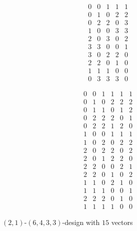 \documentclass[a4paper, 11pt]{article}
\theoremstyle{definition}
\begin{document}
\begin{figure}[htbp]
  \centering

  \begin{minipage}{0.48\linewidth}
    \centering
    \[
    \begin{array}{ccccc}
    0 & 0 & 1 & 1 & 1 \\
    0 & 1 & 0 & 2 & 2 \\
    0 & 2 & 2 & 0 & 3 \\
    1 & 0 & 0 & 3 & 3 \\
    2 & 0 & 3 & 0 & 2 \\
    3 & 3 & 0 & 0 & 1 \\
    3 & 0 & 2 & 2 & 0 \\
    2 & 2 & 0 & 1 & 0 \\
    1 & 1 & 1 & 0 & 0 \\
    0 & 3 & 3 & 3 & 0 
    \end{array}
    \]
    \caption{$(2,1)$-$(5,3,4,1)$-design with $10$ vectors}
    \label{fig:example-array-5col}
  \end{minipage}
  \hfill
  \begin{minipage}{0.48\linewidth}
    \centering
    \[
    \begin{array}{cccccc}
    0 & 0 & 1 & 1 & 1 & 1 \\
    0 & 1 & 0 & 2 & 2 & 2 \\
    0 & 1 & 1 & 0 & 1 & 2 \\
    0 & 2 & 2 & 2 & 0 & 1 \\
    0 & 2 & 2 & 1 & 2 & 0 \\
    1 & 0 & 0 & 1 & 1 & 1 \\
    1 & 0 & 2 & 0 & 2 & 2 \\
    2 & 0 & 2 & 2 & 0 & 2 \\
    2 & 0 & 1 & 2 & 2 & 0 \\
    2 & 2 & 0 & 0 & 2 & 1 \\
    2 & 2 & 0 & 1 & 0 & 2 \\
    1 & 1 & 0 & 2 & 1 & 0 \\
    1 & 1 & 1 & 0 & 0 & 1 \\
    2 & 2 & 2 & 0 & 1 & 0 \\
    1 & 1 & 1 & 1 & 0 & 0
    \end{array}
    \]
    \caption{$(2,1)$-$(6,4,3,3)$-design with $15$ vectors}
    \label{fig:example-array}
  \end{minipage}

\end{figure}
\end{document}
